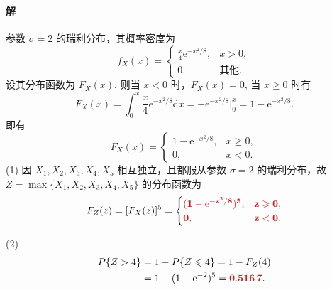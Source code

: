 \documentclass[11pt, UTF8]{ctexart}
\newcommand{\ans}[1]{\mathbf{\color{fred}#1}}
\begin{document}
\paragraph{\color{fblue}解}
参数 $\sigma = 2$ 的瑞利分布，其概率密度为
\[ f_X(x) = \begin{cases} \frac{x}{4}\mathrm{e}^{-x^2/8}, & x > 0, \\ 0, & \text{其他.} \end{cases} \]
设其分布函数为 $F_X(x)$. 则当 $x < 0$ 时，$F_X(x) = 0$, 当 $x \geqslant 0$ 时有
\[ F_X(x) = \int_{0}^{x} \frac{x}{4}\mathrm{e}^{-x^2/8}\mathrm{d}x = -\mathrm{e}^{-x^2/8} \Bigg|_{0}^{x} = 1 - \mathrm{e}^{-x^2/8}. \]
即有
\[ F_X(x) = \begin{cases} 1 - \mathrm{e}^{-x^2/8}, & x \geqslant 0, \\ 0, & x < 0. \end{cases} \]
(1) 因 $X_1, X_2, X_3, X_4, X_5$ 相互独立，且都服从参数 $\sigma = 2$ 的瑞利分布，故 $Z = \max\{X_1, X_2, X_3, X_4, X_5\}$ 的分布函数为
\[ F_Z(z) = [F_X(z)]^5 = \begin{cases} \ans{(1 - \mathrm{e}^{-z^2/8})^5,} & \ans{z \geqslant 0,} \\ \ans{0,} & \ans{z < 0.} \end{cases} \]

(2) 
\begin{align*} 
P\{Z > 4\} &= 1 - P\{Z \leqslant 4\} = 1 - F_Z(4) \\
&= 1 - (1 - \mathrm{e}^{-2})^5 = \ans{0.516\,7}.
\end{align*}
\end{document}
